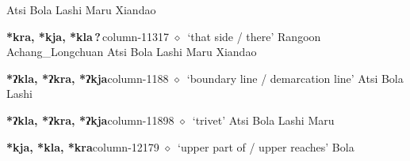 \hspace{1ex}
         Atsi 
\hspace{1ex}
         Bola 
\hspace{1ex}
         Lashi 
\hspace{1ex}
         Maru 
\hspace{1ex}
         Xiandao 
  \item {\footnotesize \textbf{*kra, *kja, *kla\,?\,}}{\tiny column-11317}
         $\diamond$~`that side / there'
         Rangoon 
\hspace{1ex}
         Achang\_Longchuan 
\hspace{1ex}
         Atsi 
\hspace{1ex}
         Bola 
\hspace{1ex}
         Lashi 
\hspace{1ex}
         Maru 
\hspace{1ex}
         Xiandao 
  \item {\footnotesize \textbf{*ʔkla, *ʔkra, *ʔkja}}{\tiny column-1188}
         $\diamond$~`boundary line / demarcation line'
         Atsi 
\hspace{1ex}
         Bola 
\hspace{1ex}
         Lashi 
  \item {\footnotesize \textbf{*ʔkla, *ʔkra, *ʔkja}}{\tiny column-11898}
         $\diamond$~`trivet'
         Atsi 
\hspace{1ex}
         Bola 
\hspace{1ex}
         Lashi 
\hspace{1ex}
         Maru 
  \item {\footnotesize \textbf{*kja, *kla, *kra}}{\tiny column-12179}
         $\diamond$~`upper part of / upper reaches'
         Bola 

